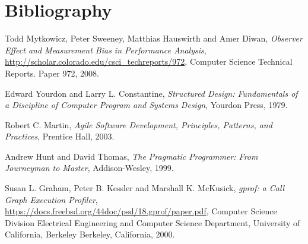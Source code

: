 \chapter{Bibliography}
\begin{thebibliography}{9}
            
  Todd Mytkowicz, Peter Sweeney, Matthias Hauswirth and Amer Diwan,
  \emph{Observer Effect and Measurement Bias in Performance Analysis},
  \url{http://scholar.colorado.edu/csci_techreports/972},
  Computer Science Technical Reports. Paper 972,
  2008.
      
  Edward Yourdon and Larry L. Constantine,
  \emph{Structured Design: Fundamentals of a Discipline of Computer Program and Systems Design},
  Yourdon Press,
  1979.
    
  Robert C. Martin,
  \emph{Agile Software Development, Principles, Patterns, and Practices},
  Prentice Hall,
  2003.
    
  Andrew Hunt and David Thomas,
  \emph{The Pragmatic Programmer: From Journeyman to Master},
  Addison-Wesley,
  1999.
            
  Susan L. Graham, Peter B. Kessler and Marshall K. McKusick,
  \emph{gprof: a Call Graph Execution Profiler},
  \url{https://docs.freebsd.org/44doc/psd/18.gprof/paper.pdf},
  Computer Science Division Electrical Engineering and Computer Science Department, University of California, Berkeley Berkeley, California,
  2000.
\end{thebibliography}